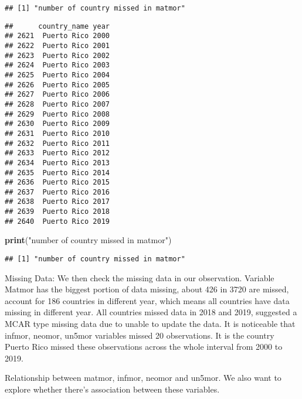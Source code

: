 \documentclass[
]{article}
\newenvironment{Shaded}{\begin{snugshade}}{\end{snugshade}}
\newcommand{\FunctionTok}[1]{\textcolor[rgb]{0.13,0.29,0.53}{\textbf{#1}}}
\newcommand{\NormalTok}[1]{#1}
\newcommand{\OtherTok}[1]{\textcolor[rgb]{0.56,0.35,0.01}{#1}}
\newcommand{\SpecialCharTok}[1]{\textcolor[rgb]{0.81,0.36,0.00}{\textbf{#1}}}
\newcommand{\StringTok}[1]{\textcolor[rgb]{0.31,0.60,0.02}{#1}}
\begin{document}
\begin{verbatim}
## [1] "number of country missed in matmor"
\end{verbatim}

\begin{Shaded}
\end{Shaded}

\begin{verbatim}
##      country_name year
## 2621  Puerto Rico 2000
## 2622  Puerto Rico 2001
## 2623  Puerto Rico 2002
## 2624  Puerto Rico 2003
## 2625  Puerto Rico 2004
## 2626  Puerto Rico 2005
## 2627  Puerto Rico 2006
## 2628  Puerto Rico 2007
## 2629  Puerto Rico 2008
## 2630  Puerto Rico 2009
## 2631  Puerto Rico 2010
## 2632  Puerto Rico 2011
## 2633  Puerto Rico 2012
## 2634  Puerto Rico 2013
## 2635  Puerto Rico 2014
## 2636  Puerto Rico 2015
## 2637  Puerto Rico 2016
## 2638  Puerto Rico 2017
## 2639  Puerto Rico 2018
## 2640  Puerto Rico 2019
\end{verbatim}

\begin{Shaded}
\begin{Highlighting}[]
\FunctionTok{print}\NormalTok{(}\StringTok{"number of country missed in matmor"}\NormalTok{)}
\end{Highlighting}
\end{Shaded}

\begin{verbatim}
## [1] "number of country missed in matmor"
\end{verbatim}

Missing Data: We then check the missing data in our observation.
Variable Matmor has the biggest portion of data missing, about 426 in
3720 are missed, account for 186 countries in different year, which
means all countries have data missing in different year. All countries
missed data in 2018 and 2019, suggested a MCAR type missing data due to
unable to update the data. It is noticeable that infmor, neomor, un5mor
variables missed 20 observations. It is the country Puerto Rico missed
these observations across the whole interval from 2000 to 2019.

Relationship between matmor, infmor, neomor and un5mor. We also want to
explore whether there's association between these variables.
\end{document}
